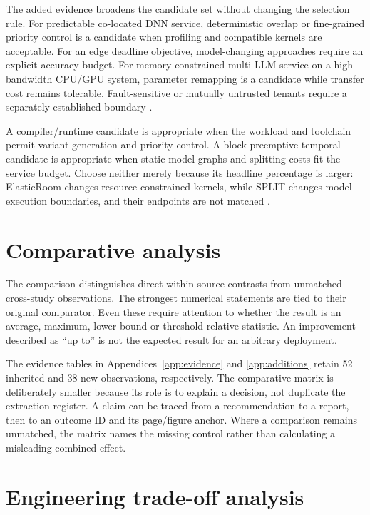 The added evidence broadens the candidate set without changing the selection rule. For predictable co-located DNN service, deterministic overlap or fine-grained priority control is a candidate when profiling and compatible kernels are acceptable. For an edge deadline objective, model-changing approaches require an explicit accuracy budget. For memory-constrained multi-LLM service on a high-bandwidth CPU/GPU system, parameter remapping is a candidate while transfer cost remains tolerable. Fault-sensitive or mutually untrusted tenants require a separately established boundary \cite{s021,s022,s023,s024,s025,s026}.

A compiler/runtime candidate is appropriate when the workload and toolchain permit variant generation and priority control. A block-preemptive temporal candidate is appropriate when static model graphs and splitting costs fit the service budget. Choose neither merely because its headline percentage is larger: ElasticRoom changes resource-constrained kernels, while SPLIT changes model execution boundaries, and their endpoints are not matched \cite{s028,s029}.

\section{Comparative analysis}
The comparison distinguishes direct within-source contrasts from unmatched cross-study observations. The strongest numerical statements are tied to their original comparator. Even these require attention to whether the result is an average, maximum, lower bound or threshold-relative statistic. An improvement described as ``up to'' is not the expected result for an arbitrary deployment.



The evidence tables in Appendices~\ref{app:evidence} and \ref{app:additions} retain 52 inherited and 38 new observations, respectively. The comparative matrix is deliberately smaller because its role is to explain a decision, not duplicate the extraction register. A claim can be traced from a recommendation to a report, then to an outcome ID and its page/figure anchor. Where a comparison remains unmatched, the matrix names the missing control rather than calculating a misleading combined effect.

\section{Engineering trade-off analysis}
